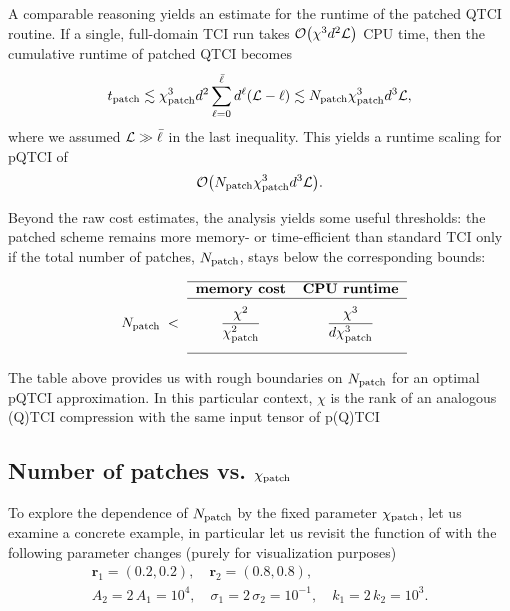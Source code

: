 A comparable reasoning yields an estimate for the runtime  of the patched QTCI routine. If a single, full-domain TCI run takes  $\mathcal{O}\bigl( \chi^3 d^2 \mathcal{L} \bigr)$ CPU time, then the cumulative runtime of patched QTCI becomes
\begin{equation}
	t_{\text{patch}} \lesssim \chi_{\text{patch}}^3 d^2 \sum_{\ell = 0}^{{\bar \ell}} d^\ell (\mathcal{L} - \ell) \lesssim  N_{\text{patch}} \chi_{\text{patch}}^3 d^3 \mathcal{L},
\end{equation}
where we assumed $\mathcal{L} \gg {\bar \ell}$ in the last inequality. This yields a runtime scaling for pQTCI of 
\begin{equation}
	\mathcal{O}\bigl(N_{\text{patch}} \chi_{\text{patch}}^3 d^3 \mathcal{L}\bigr).
	\label{eq:PatchTimeScaling}
\end{equation}

Beyond the raw cost estimates, the analysis yields some useful thresholds: the patched scheme remains more memory- or time-efficient than standard TCI only if the total number of patches, $N_{\text{patch}}$, stays below the corresponding bounds:

\begin{equation}
  \begin{tabular}{ccc}
    \cline{2-3}
      & \textbf{memory cost} & \textbf{CPU runtime} \\ \cline{2-3} \\[-6pt]
    $\Np\;<$ &
      $\displaystyle \frac{\chi^{2}}{\chi_{\text{patch}}^{2}}$ &
      $\displaystyle \frac{\chi^{3}}{d\chi_{\text{patch}}^{3}}$ \\[15pt]\cline{2-3}
  \end{tabular}
  \label{eq:chiPatchBound}
\end{equation}

The table above provides us with rough boundaries on $N_{\text{patch}}$ for an optimal pQTCI approximation. In this particular context, $\chi$ is the rank of an analogous (Q)TCI compression with the same input tensor of p(Q)TCI

\subsection{Number of patches vs. $\chi_{\text{patch}}$}
To explore the dependence of $N_{\text{patch}}$ by the fixed parameter $\chi_{\text{patch}}$, let us examine a concrete example, in particular let us revisit the function of  with the following parameter changes (purely for visualization purposes)
\begin{equation}
	\label{eq:localFuncNewParams}
\begin{gathered}
	\boldsymbol{r}_{1} = ( 0.2, 0.2), \quad \boldsymbol{r}_{2} = ( 0.8, 0.8),\\[6pt]
	A_2 = 2\, A_1 = 10^4, \quad \sigma_1 = 2\, \sigma_2 = 10^{-1}, \quad k_1 = 2\, k_2 = 10^3. 	
\end{gathered}
\end{equation}


